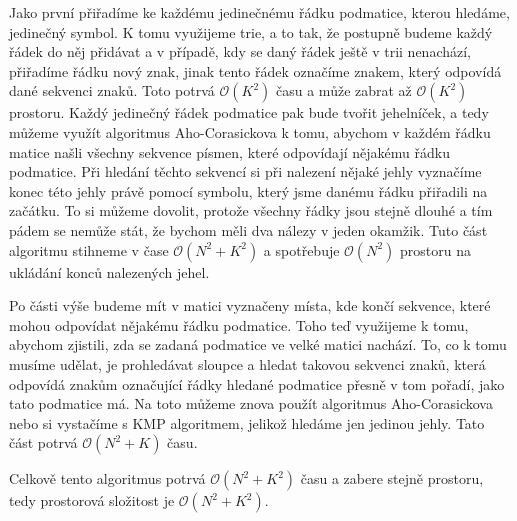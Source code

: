 \documentclass{fkssolpub}
\author{Ondřej Sedláček}
\begin{document}
Jako první přiřadíme ke každému jedinečnému řádku podmatice, kterou hledáme, jedinečný symbol. K tomu využijeme trie, a to tak, že postupně budeme každý řádek do něj přidávat a v případě, kdy se daný řádek ještě v trii nenachází, přiřadíme řádku nový znak, jinak tento řádek označíme znakem, který odpovídá dané sekvenci znaků. Toto potrvá $\mathcal{O}(K^2)$ času a může zabrat až $\mathcal{O}(K^2)$ prostoru. Každý jedinečný řádek podmatice pak bude tvořit jehelníček, a tedy můžeme využít algoritmus Aho-Corasickova k tomu, abychom v každém řádku matice našli všechny sekvence písmen, které odpovídají nějakému řádku podmatice. Při hledání těchto sekvencí si při nalezení nějaké jehly vyznačíme konec této jehly právě pomocí symbolu, který jsme danému řádku přiřadili na začátku. To si můžeme dovolit, protože všechny řádky jsou stejně dlouhé a tím pádem se nemůže stát, že bychom měli dva nálezy v jeden okamžik. Tuto část algoritmu stihneme v čase $\mathcal{O}(N^2 + K^2)$ a spotřebuje $\mathcal{O}(N^2)$ prostoru na ukládání konců nalezených jehel.

Po části výše budeme mít v matici vyznačeny místa, kde končí sekvence, které mohou odpovídat nějakému řádku podmatice. Toho teď využijeme k tomu, abychom zjistili, zda se zadaná podmatice ve velké matici nachází. To, co k tomu musíme udělat, je prohledávat sloupce a hledat takovou sekvenci znaků, která odpovídá znakům označující řádky hledané podmatice přesně v tom pořadí, jako tato podmatice má. Na toto můžeme znova použít algoritmus Aho-Corasickova nebo si vystačíme s KMP algoritmem, jelikož hledáme jen jedinou jehly. Tato část potrvá $\mathcal{O}(N^2 + K)$ času.

Celkově tento algoritmus potrvá $\mathcal{O}(N^2 + K^2)$ času a zabere stejně prostoru, tedy prostorová složitost je $\mathcal{O}(N^2 + K^2)$.
\end{document}
